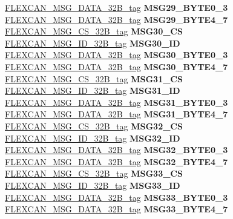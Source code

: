 \begin{DoxyCompactItemize}
\begin{tabbing}
\>\>\mbox{\hyperlink{unionFLEXCAN__MSG__DATA__32B__tag}{FLEXCAN\_MSG\_DATA\_32B\_tag}} {\bfseries MSG29\_BYTE0\_3}\\
\>\>\mbox{\hyperlink{unionFLEXCAN__MSG__DATA__32B__tag}{FLEXCAN\_MSG\_DATA\_32B\_tag}} {\bfseries MSG29\_BYTE4\_7}\\
\>\>\mbox{\hyperlink{unionFLEXCAN__MSG__CS__32B__tag}{FLEXCAN\_MSG\_CS\_32B\_tag}} {\bfseries MSG30\_CS}\\
\>\>\mbox{\hyperlink{unionFLEXCAN__MSG__ID__32B__tag}{FLEXCAN\_MSG\_ID\_32B\_tag}} {\bfseries MSG30\_ID}\\
\>\>\mbox{\hyperlink{unionFLEXCAN__MSG__DATA__32B__tag}{FLEXCAN\_MSG\_DATA\_32B\_tag}} {\bfseries MSG30\_BYTE0\_3}\\
\>\>\mbox{\hyperlink{unionFLEXCAN__MSG__DATA__32B__tag}{FLEXCAN\_MSG\_DATA\_32B\_tag}} {\bfseries MSG30\_BYTE4\_7}\\
\>\>\mbox{\hyperlink{unionFLEXCAN__MSG__CS__32B__tag}{FLEXCAN\_MSG\_CS\_32B\_tag}} {\bfseries MSG31\_CS}\\
\>\>\mbox{\hyperlink{unionFLEXCAN__MSG__ID__32B__tag}{FLEXCAN\_MSG\_ID\_32B\_tag}} {\bfseries MSG31\_ID}\\
\>\>\mbox{\hyperlink{unionFLEXCAN__MSG__DATA__32B__tag}{FLEXCAN\_MSG\_DATA\_32B\_tag}} {\bfseries MSG31\_BYTE0\_3}\\
\>\>\mbox{\hyperlink{unionFLEXCAN__MSG__DATA__32B__tag}{FLEXCAN\_MSG\_DATA\_32B\_tag}} {\bfseries MSG31\_BYTE4\_7}\\
\>\>\mbox{\hyperlink{unionFLEXCAN__MSG__CS__32B__tag}{FLEXCAN\_MSG\_CS\_32B\_tag}} {\bfseries MSG32\_CS}\\
\>\>\mbox{\hyperlink{unionFLEXCAN__MSG__ID__32B__tag}{FLEXCAN\_MSG\_ID\_32B\_tag}} {\bfseries MSG32\_ID}\\
\>\>\mbox{\hyperlink{unionFLEXCAN__MSG__DATA__32B__tag}{FLEXCAN\_MSG\_DATA\_32B\_tag}} {\bfseries MSG32\_BYTE0\_3}\\
\>\>\mbox{\hyperlink{unionFLEXCAN__MSG__DATA__32B__tag}{FLEXCAN\_MSG\_DATA\_32B\_tag}} {\bfseries MSG32\_BYTE4\_7}\\
\>\>\mbox{\hyperlink{unionFLEXCAN__MSG__CS__32B__tag}{FLEXCAN\_MSG\_CS\_32B\_tag}} {\bfseries MSG33\_CS}\\
\>\>\mbox{\hyperlink{unionFLEXCAN__MSG__ID__32B__tag}{FLEXCAN\_MSG\_ID\_32B\_tag}} {\bfseries MSG33\_ID}\\
\>\>\mbox{\hyperlink{unionFLEXCAN__MSG__DATA__32B__tag}{FLEXCAN\_MSG\_DATA\_32B\_tag}} {\bfseries MSG33\_BYTE0\_3}\\
\>\>\mbox{\hyperlink{unionFLEXCAN__MSG__DATA__32B__tag}{FLEXCAN\_MSG\_DATA\_32B\_tag}} {\bfseries MSG33\_BYTE4\_7}\\

\end{tabbing}
\end{DoxyCompactItemize}
